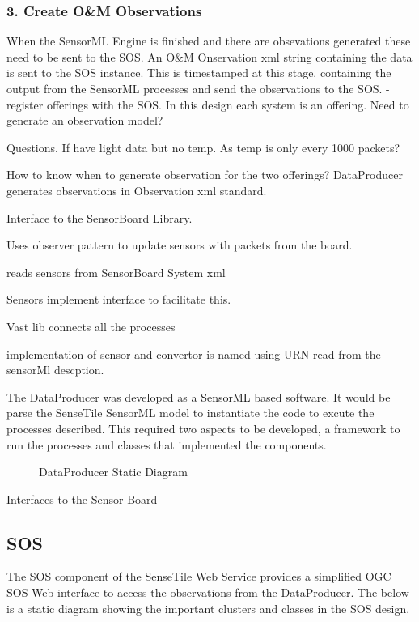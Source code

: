 \documentclass[]{final_report}
\begin{document}
\subsubsection {3. Create O\&M Observations}

When the SensorML Engine is finished
and there are obsevations generated these
need to be sent to the SOS. An O\&M Onservation
xml string containing the data is sent to
the SOS instance. This is timestamped at
this stage.
 containing the output from
the SensorML processes and send the observations
to the SOS.
-register offerings with the SOS. In this design
each system is an offering.
Need to generate an observation model?


Questions.
If have light data but no temp. As temp is only
every 1000 packets?

How to know when to generate observation
for the two offerings?
DataProducer generates observations in Observation xml standard.

Interface to the SensorBoard Library.

Uses observer pattern to update sensors with packets from the board.

reads sensors from SensorBoard System xml

Sensors implement interface to facilitate this.

Vast lib connects all the processes

implementation of sensor and convertor is named using URN read from the sensorMl descption.


The DataProducer was developed as a SensorML based software. It would be parse the SenseTile SensorML model to instantiate the code to excute the processes described. This required two aspects to be developed, a framework to run the processes and classes that implemented the components.

\begin{figure}[h]
\caption{DataProducer Static Diagram}\label{fig:bon_static_diagam_producer.png}
\end{figure}

Interfaces to the Sensor Board


\newpage
\subsection {SOS}

The SOS component of the SenseTile Web Service provides a simplified OGC SOS Web interface to access the observations from the DataProducer. The below is a static diagram showing the important clusters and classes in the SOS design.
\end{document}
